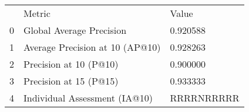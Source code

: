 \begin{tabular}{lll}
 & Metric & Value \\
0 & Global Average Precision & 0.920588 \\
1 & Average Precision at 10 (AP@10) & 0.928263 \\
2 & Precision at 10 (P@10) & 0.900000 \\
3 & Precision at 15 (P@15) & 0.933333 \\
4 & Individual Assessment (IA@10) & RRRRNRRRRR \\
\end{tabular}

